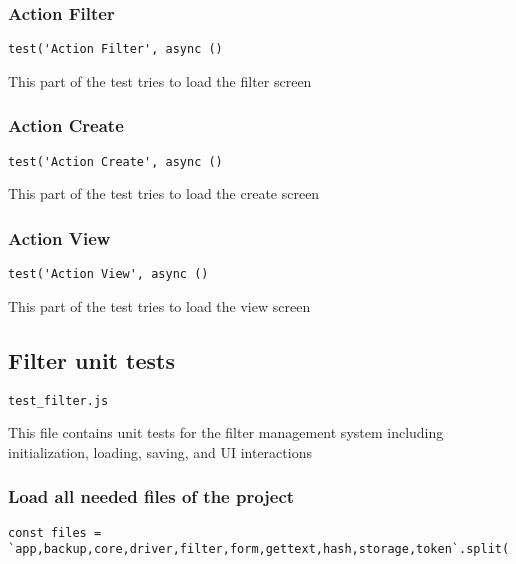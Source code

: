 \documentclass[a4paper]{article}
\begin{document}
\hypertarget{toc142}{}
\subsubsection{Action Filter}

\begin{lstlisting}
test('Action Filter', async ()
\end{lstlisting}

This part of the test tries to load the filter screen

\hypertarget{toc143}{}
\subsubsection{Action Create}

\begin{lstlisting}
test('Action Create', async ()
\end{lstlisting}

This part of the test tries to load the create screen

\hypertarget{toc144}{}
\subsubsection{Action View}

\begin{lstlisting}
test('Action View', async ()
\end{lstlisting}

This part of the test tries to load the view screen

\hypertarget{toc145}{}
\subsection{Filter unit tests}

\begin{lstlisting}
test_filter.js
\end{lstlisting}

This file contains unit tests for the filter management system
including initialization, loading, saving, and UI interactions

\hypertarget{toc146}{}
\subsubsection{Load all needed files of the project}

\begin{lstlisting}
const files = `app,backup,core,driver,filter,form,gettext,hash,storage,token`.split(',');
\end{lstlisting}
\end{document}
